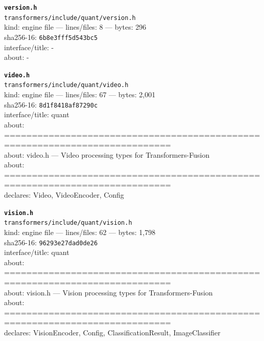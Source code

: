 \noindent\textbf{\texttt{version.h}}\\
\texttt{transformers/include/quant/version.h}\\
kind: engine file --- lines/files: 8 --- bytes: 296\\
sha256-16: \texttt{6b8e3fff5d543bc5}\\
interface/title: -\\
about: -\\
\vspace*{6.0pt}
\newpage

\noindent\textbf{\texttt{video.h}}\\
\texttt{transformers/include/quant/video.h}\\
kind: engine file --- lines/files: 67 --- bytes: 2,001\\
sha256-16: \texttt{8d1f8418af87290c}\\
interface/title: quant\\
about: ============================================================================\\
about: video.h — Video processing types for Transformers-Fusion\\
about: ============================================================================\\
declares: Video, VideoEncoder, Config\\
\vspace*{6.0pt}

\noindent\textbf{\texttt{vision.h}}\\
\texttt{transformers/include/quant/vision.h}\\
kind: engine file --- lines/files: 62 --- bytes: 1,798\\
sha256-16: \texttt{96293e27dad0de26}\\
interface/title: quant\\
about: ============================================================================\\
about: vision.h — Vision processing types for Transformers-Fusion\\
about: ============================================================================\\
declares: VisionEncoder, Config, ClassificationResult, ImageClassifier\\
\vspace*{6.0pt}

